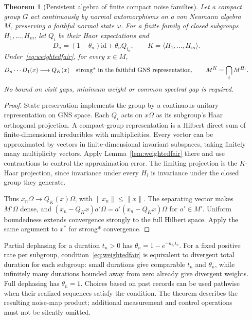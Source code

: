 \documentclass[12pt]{article}
\newtheorem{theorem}{Theorem}[section]
\theoremstyle{definition}
\theoremstyle{remark}
\begin{document}
\begin{theorem}[Persistent algebra of finite compact noise families]
\label{thm:compactnoise}
Let a compact group \(G\) act continuously by normal automorphisms
on a von Neumann algebra \(M\), preserving a faithful normal state
\(\omega\). For a finite family of closed subgroups \(H_1,\ldots,H_m\),
let \(Q_i\) be their Haar expectations and
\[
 D_n=(1-\theta_n)\mathrm{id}+\theta_n Q_{i_n},\qquad
 K=\overline{\langle H_1,\ldots,H_m\rangle}.
\]
Under~\eqref{eq:weightedfair}, for every \(x\in M\),
\[
 D_n\cdots D_1(x)\longrightarrow Q_K(x)
 \quad\hbox{strong* in the faithful GNS representation},\qquad
 M^K=\bigcap_i M^{H_i}.
\]
No bound on visit gaps, minimum weight or common spectral gap is
required.
\end{theorem}
\begin{proof}
State preservation implements the group by a continuous unitary
representation on GNS space. Each \(Q_i\) acts on \(x\Omega\)
as its subgroup's Haar orthogonal projection.
A compact-group representation is a Hilbert direct sum of
finite-dimensional irreducibles with multiplicities. Every vector
can be approximated by vectors in finite-dimensional invariant
subspaces, taking finitely many multiplicity vectors. Apply
Lemma~\ref{lem:weightedfair} there and use contractions to control
the approximation error. The limiting projection is the \(K\)-Haar
projection, since invariance under every \(H_i\) is invariance under
the closed group they generate.

Thus \(x_n\Omega\to Q_K(x)\Omega\), with \(\|x_n\|\le\|x\|\).
The separating vector makes \(M'\Omega\) dense, and
\((x_n-Q_Kx)a'\Omega=a'(x_n-Q_Kx)\Omega\) for \(a'\in M'\).
Uniform boundedness extends convergence strongly to the full
Hilbert space. Apply the same argument to \(x^*\) for strong*
convergence.
\end{proof}

Partial dephasing for a duration \(t_n>0\) has
\(\theta_n=1-e^{-\kappa_{i_n}t_n}\). For a fixed positive rate
per subgroup, condition~\eqref{eq:weightedfair} is equivalent to
divergent total duration for each subgroup: small durations give
comparable \(t_n\) and \(\theta_n\), while infinitely many durations
bounded away from zero already give divergent weights.
Full dephasing has \(\theta_n=1\).
Choices based on past records can be used pathwise when their
realized sequences satisfy the condition. The theorem describes
the resulting noise-map product; additional measurement and
control operations must not be silently omitted.
\end{document}
